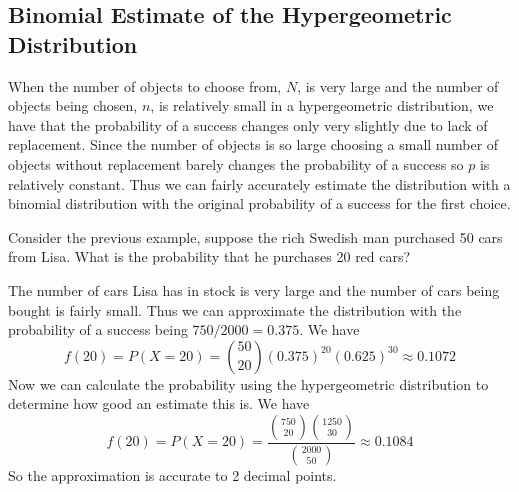 \subsection{Binomial Estimate of the Hypergeometric Distribution}
When the number of objects to choose from, $N$, is very large and the number of objects being chosen, $n$, is relatively small in a hypergeometric distribution, we have that the probability of a success changes only very slightly due to lack of replacement. Since the number of objects is so large choosing a small number of objects without replacement barely changes the probability of a success so $p$ is relatively constant. Thus we can fairly accurately estimate the distribution with a binomial distribution with the original probability of a success for the first choice.
\begin{example}
Consider the previous example, suppose the rich Swedish man purchased 50 cars from Lisa. What is the probability that he purchases 20 red cars?
\par\smallskip
The number of cars Lisa has in stock is very large and the number of cars being bought is fairly small. Thus we can approximate the distribution with the probability of a success being $750/2000 = 0.375$. We have
\[
    f(20) = P(X = 20) = \binom{50}{20} (0.375)^{20} (0.625)^{30} \approx 0.1072
\]
Now we can calculate the probability using the hypergeometric distribution to determine how good an estimate this is. We have
\[
    f(20) = P(X = 20) = \frac{\binom{750}{20} \binom{1250}{30}}{\binom{2000}{50}} \approx 0.1084
\]
So the approximation is accurate to 2 decimal points.
\end{example}
